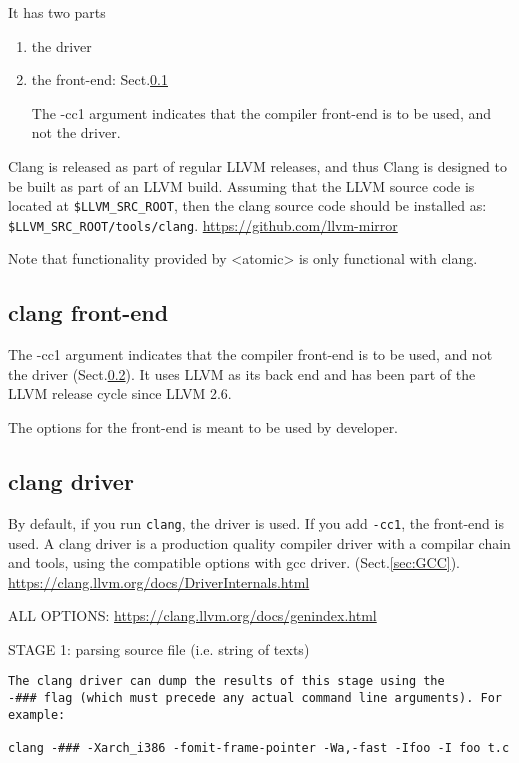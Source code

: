 It has two parts
\begin{enumerate}
  \item the driver
  
  \item the front-end:  Sect.\ref{sec:clang-front-end}
  
  The -cc1 argument indicates that the compiler front-end is to be used, and not
  the driver.
\end{enumerate}


Clang is released as part of regular LLVM releases, and thus Clang is designed
to be built as part of an LLVM build. Assuming that the LLVM source code is
located at \verb!$LLVM_SRC_ROOT!, then the clang source code should be installed
as:   \verb!$LLVM_SRC_ROOT/tools/clang!.
\url{https://github.com/llvm-mirror}


Note that functionality provided by <atomic> is only functional with clang.

\subsection{clang front-end}
\label{sec:clang-front-end}

The -cc1 argument indicates that the compiler front-end is to be used, and not
the driver (Sect.\ref{sec:clang-driver}).  It uses LLVM as its back end and has
been part of the LLVM release cycle since LLVM 2.6.

The options for the front-end is meant to be used by developer.


\subsection{clang driver}
\label{sec:clang-driver}

By default, if you run \verb!clang!, the driver is used. If you add \verb!-cc1!,
the front-end is used. A clang driver is a production quality compiler driver
with a compilar chain and tools, using the compatible options with gcc driver.
(Sect.\ref{sec:GCC}). \url{https://clang.llvm.org/docs/DriverInternals.html}

ALL OPTIONS: \url{https://clang.llvm.org/docs/genindex.html}

STAGE 1: parsing source file (i.e. string of texts)
\begin{verbatim}
The clang driver can dump the results of this stage using the 
-### flag (which must precede any actual command line arguments). For example:

clang -### -Xarch_i386 -fomit-frame-pointer -Wa,-fast -Ifoo -I foo t.c
\end{verbatim}


